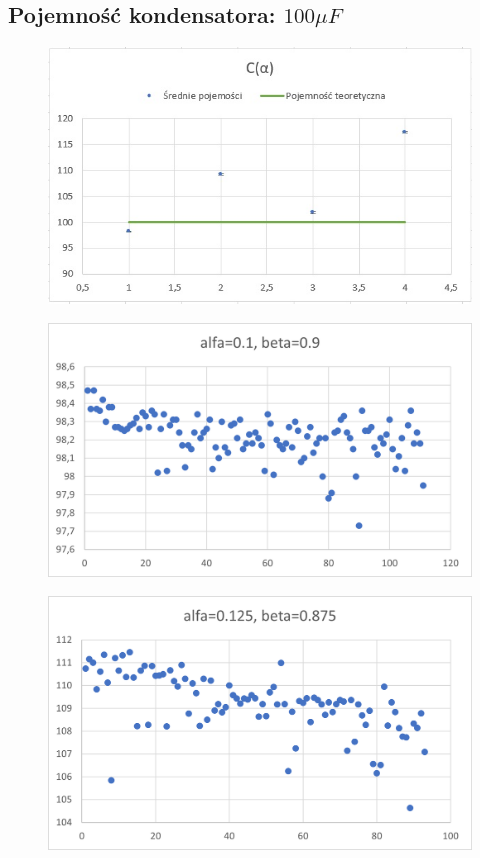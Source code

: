 \documentclass[12pt]{mwart}
\begin{document}
	\subsection{Pojemność kondensatora: $100 \mu F$}
	\begin{figure}[H]
		\centering
		\includegraphics{100_sr.jpg}
	\end{figure}
	\begin{figure}[H]
		\centering
		\includegraphics{100_a0.1.png}
	\end{figure}
	\begin{figure}[H]
		\centering
		\includegraphics{100_a0.125.png}
	\end{figure}
\end{document}

